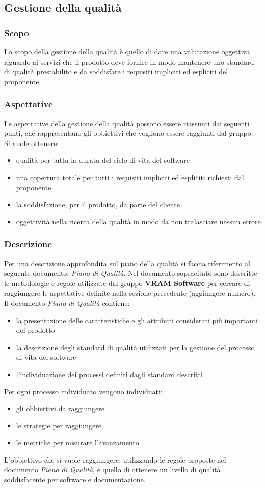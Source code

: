 \subsection{Gestione della qualità}
\subsubsection{Scopo}
Lo scopo della gestione della qualità è quello di dare una valutazione oggettiva riguardo ai servizi che il prodotto deve fornire in modo mantenere uno standard di qualità prestabilito e da soddisfare i requisiti impliciti ed espliciti del proponente.
\subsubsection{Aspettative}
Le aspettative della gestione della qualità possono essere riassunti dai seguenti punti, che rappresentano gli obbiettivi che vogliono essere raggiunti dal gruppo. Si vuole ottenere:
\begin{itemize}
	\item qualità per tutta la durata del ciclo di vita del software
	\item una copertura totale per tutti i requisiti impliciti ed espliciti richiesti dal proponente
	\item la soddisfazione, per il prodotto, da parte del cliente
	\item oggettività nella ricerca della qualità in modo da non tralasciare nessun errore
\end{itemize}
\subsubsection{Descrizione}
Per una descrizione approfondita sul piano della qualità si faccia riferimento al seguente documento: \textit{Piano di Qualità}.
Nel documento sopracitato sono descritte le metodologie e regole utilizzate dal gruppo \textbf{VRAM Software} per cercare di raggiungere le aspettative definite nella sezione precedente (aggiungere numero).
Il documento \textit{Piano di Qualità} contiene:
\begin{itemize}
	\item la presentazione delle caratteristiche e gli attributi considerati più importanti del prodotto
	\item la descrizione degli standard di qualità utilizzati per la gestione del processo di vita del software
	\item l'individuazione dei processi definiti dagli standard descritti
\end{itemize}
Per ogni processo individuato vengono individuati:
\begin{itemize}
	\item gli obbiettivi da raggiungere
	\item le strategie per raggiungere
	\item le metriche per misurare l'avanzamento
\end{itemize}
L'obbiettivo che si vuole raggiungere, utilizzando le regole proposte nel documento \textit{Piano di Qualità}, è quello di ottenere un livello di qualità soddisfacente per software e documentazione.
